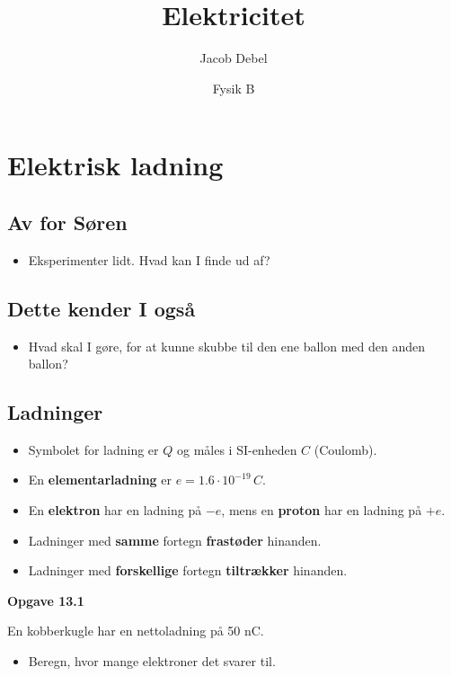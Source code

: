 \documentclass[11pt]{article}
\author{Jacob Debel}
\date{Fysik B}
\title{Elektricitet}
\begin{document}
\maketitle

\section*{Elektrisk ladning}
\label{sec:org054cb49}
\subsection*{Av for Søren}
\label{sec:org5be59ea}
\begin{itemize}
\item Eksperimenter lidt. Hvad kan I finde ud af?
\end{itemize}

\subsection*{Dette kender I også}
\label{sec:org1b43472}
\begin{itemize}
\item Hvad skal I gøre, for at kunne skubbe til den ene ballon med den anden ballon?
\end{itemize}

\subsection*{Ladninger}
\label{sec:org7990c51}
\begin{itemize}
\item Symbolet for ladning er \(Q\) og måles i SI-enheden \(C\) (Coulomb).
\item En \textbf{elementarladning} er \(e=1.6 \cdot 10^{-19} \,C\).
\item En \textbf{elektron} har en ladning på \(-e\), mens en \textbf{proton} har en ladning på \(+e\).
\item Ladninger med \textbf{samme} fortegn \textbf{frastøder} hinanden.
\item Ladninger med \textbf{forskellige} fortegn \textbf{tiltrækker} hinanden.
\end{itemize}
\textbf{Opgave 13.1}

En kobberkugle har en nettoladning på 50 nC.

\begin{itemize}
\item Beregn, hvor mange elektroner det svarer til.
\end{itemize}
\end{document}
